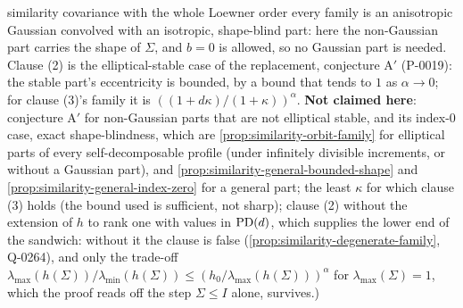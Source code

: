 \begin{proposition}
{similarity covariance with the whole Loewner order every family is an anisotropic Gaussian convolved
with an isotropic, shape-blind part: here the non-Gaussian part carries the shape of $\Sigma$, and
$b = 0$ is allowed, so no Gaussian part is needed. Clause (2) is the elliptical-stable case of the
replacement, conjecture A$'$ (P-0019): the stable part's eccentricity is bounded,
by a bound that tends to $1$ as $\alpha \to 0$; for clause (3)'s family it is
$((1+d\kappa)/(1+\kappa))^\alpha$. \textbf{Not claimed here}: conjecture A$'$ for non-Gaussian parts
that are not elliptical stable, and its index-$0$ case, exact shape-blindness, which are
\ref{prop:similarity-orbit-family} for elliptical parts of every self-decomposable profile (under
infinitely divisible increments, or without a Gaussian part), and
\ref{prop:similarity-general-bounded-shape} and \ref{prop:similarity-general-index-zero} for a general
part; the least $\kappa$ for which clause (3) holds (the bound used is sufficient, not sharp);
clause (2) without the extension of $h$ to rank one with values in $\mathrm{PD}(d)$, which supplies the lower
end of the sandwich: without it the clause is false (\ref{prop:similarity-degenerate-family}, Q-0264),
and only the trade-off $\lambda_{\max}(h(\Sigma))/\lambda_{\min}(h(\Sigma)) \le (h_0/\lambda_{\max}(h(\Sigma)))^\alpha$
for $\lambda_{\max}(\Sigma) = 1$, which the proof reads off the step $\Sigma \le I$ alone, survives.)}
\end{proposition}

